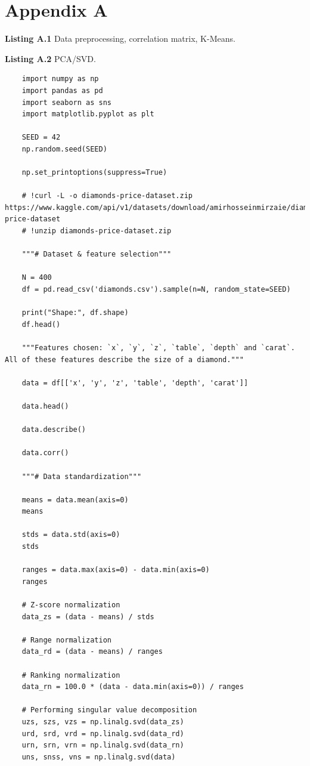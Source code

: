 \documentclass[12pt,a4paper]{article}
\begin{document}
	\section*{Appendix A}
	\begin{center}
		\noindent\textbf{Listing A.1} Data preprocessing, correlation matrix, K-Means.
	\end{center}
	
	\newpage
	\begin{center}
		\noindent\textbf{Listing A.2} PCA/SVD.
	\end{center}
	\begin{lstlisting}
	import numpy as np
	import pandas as pd
	import seaborn as sns
	import matplotlib.pyplot as plt
	
	SEED = 42
	np.random.seed(SEED)
	
	np.set_printoptions(suppress=True)
	
	# !curl -L -o diamonds-price-dataset.zip https://www.kaggle.com/api/v1/datasets/download/amirhosseinmirzaie/diamonds-price-dataset
	# !unzip diamonds-price-dataset.zip
	
	"""# Dataset & feature selection"""
	
	N = 400
	df = pd.read_csv('diamonds.csv').sample(n=N, random_state=SEED)
	
	print("Shape:", df.shape)
	df.head()
	
	"""Features chosen: `x`, `y`, `z`, `table`, `depth` and `carat`. All of these features describe the size of a diamond."""
	
	data = df[['x', 'y', 'z', 'table', 'depth', 'carat']]
	
	data.head()
	
	data.describe()
	
	data.corr()
	
	"""# Data standardization"""
	
	means = data.mean(axis=0)
	means
	
	stds = data.std(axis=0)
	stds
	
	ranges = data.max(axis=0) - data.min(axis=0)
	ranges
	
	# Z-score normalization
	data_zs = (data - means) / stds
	
	# Range normalization
	data_rd = (data - means) / ranges
	
	# Ranking normalization
	data_rn = 100.0 * (data - data.min(axis=0)) / ranges
	
	# Performing singular value decomposition
	uzs, szs, vzs = np.linalg.svd(data_zs)
	urd, srd, vrd = np.linalg.svd(data_rd)
	urn, srn, vrn = np.linalg.svd(data_rn)
	uns, snss, vns = np.linalg.svd(data)
	

\end{lstlisting}
\end{document}
